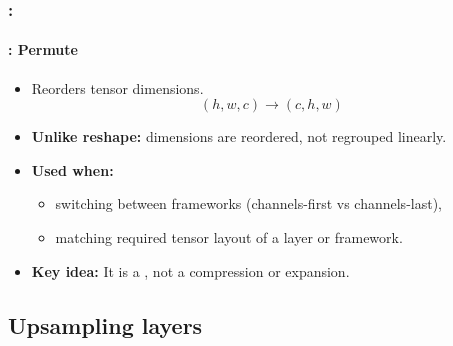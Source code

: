\documentclass[xcolor=table]{beamer}
\begin{document}
\begin{frame}
	\frametitle{\insertshortsubtitle: \insertsection}
	\framesubtitle{\insertsubsection: Permute}
	
	\begin{itemize}
		
		\item Reorders tensor dimensions.
		\[
		(h, w, c) \rightarrow (c, h, w)
		\]
		
		\item \textbf{Unlike reshape:} dimensions are reordered, not regrouped linearly.
		
		\item \textbf{Used when:}
		\begin{itemize}
			\item switching between frameworks (channels-first vs channels-last),
			\item matching required tensor layout of a layer or framework.
		\end{itemize}
		
		\item \textbf{Key idea:} It is a , not a compression or expansion.
		
	\end{itemize}
	
	\begin{center}
	\end{center}
	
\end{frame}


\subsection{Upsampling layers}
\end{document}
